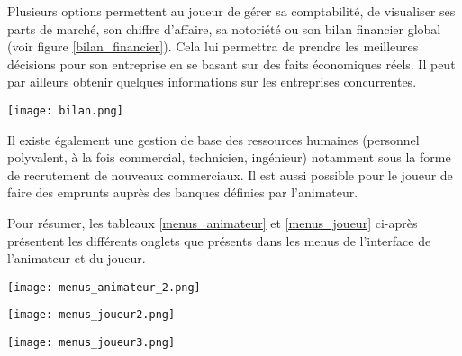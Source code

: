 Plusieurs options permettent au joueur de gérer sa comptabilité, de visualiser ses parts de marché, son chiffre d'affaire, sa notoriété ou son bilan financier global (voir figure \ref{bilan_financier}). Cela lui permettra de prendre les meilleures décisions pour son entreprise en se basant sur des faits économiques réels. Il peut par ailleurs obtenir quelques informations sur les entreprises concurrentes.

\begin{center}
\texttt{[image: bilan.png]}
\label{bilan_financier}
\end{center}

Il existe également une gestion de base des ressources humaines (personnel polyvalent, à la fois commercial, technicien, ingénieur) notamment sous la forme de recrutement de nouveaux commerciaux. Il est aussi possible pour le joueur de faire des emprunts auprès des banques définies par l'animateur.

Pour résumer, les tableaux \ref{menus_animateur} et \ref{menus_joueur} ci-après présentent les différents onglets que présents dans les menus de l'interface de l'animateur et du joueur.

\begin{center}
\texttt{[image: menus\_animateur\_2.png]}
\label{menus_animateur}
\end{center}

\begin{center}
\texttt{[image: menus\_joueur2.png]}
\end{center}

\begin{center}
\texttt{[image: menus\_joueur3.png]}
\label{menus_joueur}
\end{center}